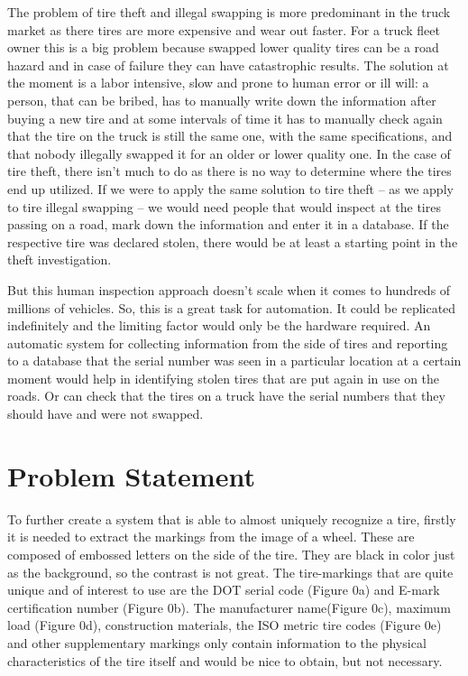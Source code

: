 The problem of tire theft and illegal swapping is more predominant in the truck market as there tires are more expensive and wear out faster. For a truck fleet owner this is a big problem because swapped lower quality tires can be a road hazard and in case of failure they can have catastrophic results. The solution at the moment is a labor intensive, slow and prone to human error or ill will: a person, that can be bribed, has to manually write down the information after buying a new tire and at some intervals of time it has to manually check again that the tire on the truck is still the same one, with the same specifications, and that nobody illegally swapped it for an older or lower quality one. In the case of tire theft, there isn't much to do as there is no way to determine where the tires end up utilized. If we were to apply the same solution to tire theft -- as we apply to tire illegal swapping -- we would need people that would inspect at the tires passing on a road, mark down the information and enter it in a database. If the respective tire was declared stolen, there would be at least a starting point in the theft investigation.

But this human inspection approach doesn't scale when it comes to hundreds of millions of vehicles. So, this is a great task for automation. It could be replicated indefinitely and the limiting factor would only be the hardware required. An automatic system for collecting information from the side of tires and reporting to a database that the serial number was seen in a particular location at a certain moment would help in identifying stolen tires that are put again in use on the roads. Or can check that the tires on a truck have the serial numbers that they should have and were not swapped.

\section{Problem Statement}
\label{sec:problem-statement}

To further create a system that is able to almost uniquely recognize a tire, firstly it is needed to extract the markings from the image of a wheel. These are composed of embossed letters on the side of the tire. They are black in color just as the background, so the contrast is not great. The tire-markings that are quite unique and of interest to use are the DOT serial code (Figure 0a) and E-mark certification number (Figure 0b). The manufacturer name(Figure 0c), maximum load (Figure 0d), construction materials, the ISO metric tire codes (Figure 0e) and other supplementary markings only contain information to the physical characteristics of the tire itself and would be nice to obtain, but not necessary.

